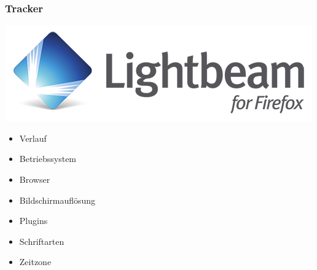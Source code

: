 
  
  \begin{frame}
    \frametitle{Tracker}
    \includegraphics[height=0.7\textheight]{../../img/lightbeam.png}
  \end{frame}
  
  \begin{frame}
    \begin{itemize}
      \item Verlauf
      \item Betriebssystem
      \item Browser
      \item Bildschirmauflösung
      \item Plugins
      \item Schriftarten
      \item Zeitzone
    \end{itemize}
  \end{frame}
  

